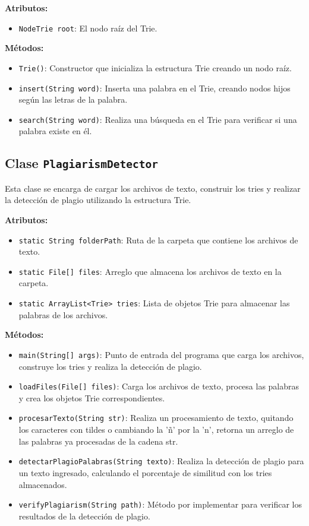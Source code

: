 \textbf{Atributos:}
\begin{itemize}
    \item \texttt{NodeTrie root}: El nodo raíz del Trie.
\end{itemize}

\textbf{Métodos:}
\begin{itemize}
    \item \texttt{Trie()}: Constructor que inicializa la estructura Trie creando un nodo raíz.
    \item \texttt{insert(String word)}: Inserta una palabra en el Trie, creando nodos hijos según las letras de la palabra.
    \item \texttt{search(String word)}: Realiza una búsqueda en el Trie para verificar si una palabra existe en él.
\end{itemize}



\subsection{Clase \texttt{PlagiarismDetector}}
Esta clase se encarga de cargar los archivos de texto, construir los tries y realizar la detección de plagio utilizando la estructura Trie.

\textbf{Atributos:}
\begin{itemize}
    \item \texttt{static String folderPath}: Ruta de la carpeta que contiene los archivos de texto.
    \item \texttt{static File[] files}: Arreglo que almacena los archivos de texto en la carpeta.
    \item \texttt{static ArrayList<Trie> tries}: Lista de objetos Trie para almacenar las palabras de los archivos.
\end{itemize}

\textbf{Métodos:}
\begin{itemize}
    \item \texttt{main(String[] args)}: Punto de entrada del programa que carga los archivos, construye los tries y realiza la detección de plagio.
    \item \texttt{loadFiles(File[] files)}: Carga los archivos de texto, procesa las palabras y crea los objetos Trie correspondientes.
    \item  \texttt{procesarTexto(String str)}: Realiza un procesamiento de texto, quitando los caracteres con tildes o cambiando la 'ñ' por la 'n', retorna un arreglo de las palabras ya procesadas de la cadena str.
    \item \texttt{detectarPlagioPalabras(String texto)}: Realiza la detección de plagio para un texto ingresado, calculando el porcentaje de similitud con los tries almacenados.
    \item \texttt{verifyPlagiarism(String path)}: Método por implementar para verificar los resultados de la detección de plagio.
\end{itemize}

